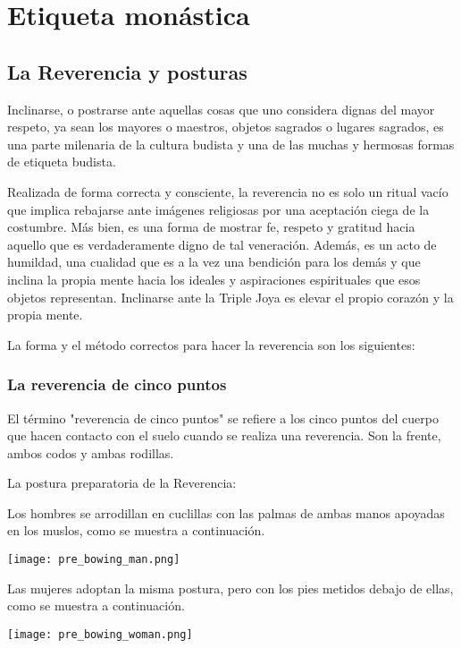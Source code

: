 \chapter*{Etiqueta monástica}
\label{etiquette}

\section{La Reverencia y posturas}

Inclinarse, o postrarse ante aquellas cosas que uno considera dignas del mayor respeto, ya sean los mayores o maestros, objetos sagrados o lugares sagrados, es una parte milenaria de la cultura budista y una de las muchas y hermosas formas de etiqueta budista.

Realizada de forma correcta y consciente, la reverencia no es solo un ritual vacío que implica rebajarse ante imágenes religiosas por una aceptación ciega de la costumbre. Más bien, es una forma de mostrar fe, respeto y gratitud hacia aquello que es verdaderamente digno de tal veneración. Además, es un acto de humildad, una cualidad que es a la vez una bendición para los demás y que inclina la propia mente hacia los ideales y aspiraciones espirituales que esos objetos representan. Inclinarse ante la Triple Joya es elevar el propio corazón y la propia mente.

La forma y el método correctos para hacer la reverencia son los siguientes:

\subsection{La reverencia de cinco puntos}

El término "reverencia de cinco puntos" se refiere a los cinco puntos del cuerpo que hacen contacto con el suelo cuando se realiza una reverencia. Son la frente, ambos codos y ambas rodillas.

La postura preparatoria de la Reverencia:

Los hombres se arrodillan en cuclillas con las palmas de ambas manos apoyadas en los muslos, como se muestra a continuación.
\begin{center}
	\texttt{[image: pre\_bowing\_man.png]}
\end{center}


Las mujeres adoptan la misma postura, pero con los pies metidos debajo de ellas, como se muestra a continuación.
\begin{center}
	\texttt{[image: pre\_bowing\_woman.png]}
\end{center}
